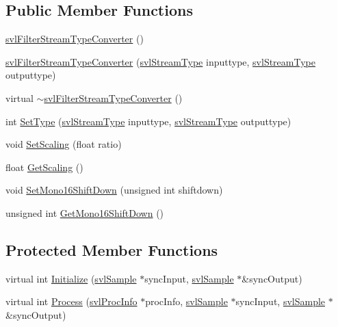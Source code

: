 \subsection*{Public Member Functions}
\begin{DoxyCompactItemize}
\item 
\hyperlink{classsvl_filter_stream_type_converter_aaa77a347109c22715ab2424785271388}{svl\+Filter\+Stream\+Type\+Converter} ()
\item 
\hyperlink{classsvl_filter_stream_type_converter_a9a169d5564d8e95cd43e11eea29d97d5}{svl\+Filter\+Stream\+Type\+Converter} (\hyperlink{svl_definitions_8h_aa00696d338a58db361335a01fd11e122}{svl\+Stream\+Type} inputtype, \hyperlink{svl_definitions_8h_aa00696d338a58db361335a01fd11e122}{svl\+Stream\+Type} outputtype)
\item 
virtual \hyperlink{classsvl_filter_stream_type_converter_aeb176e9f04ed9002d8331db010bdc797}{$\sim$svl\+Filter\+Stream\+Type\+Converter} ()
\item 
int \hyperlink{classsvl_filter_stream_type_converter_a0c8243911e530f637a47db916ee48e5d}{Set\+Type} (\hyperlink{svl_definitions_8h_aa00696d338a58db361335a01fd11e122}{svl\+Stream\+Type} inputtype, \hyperlink{svl_definitions_8h_aa00696d338a58db361335a01fd11e122}{svl\+Stream\+Type} outputtype)
\item 
void \hyperlink{classsvl_filter_stream_type_converter_a36b3dca1d8716b3ffea707b3f69239eb}{Set\+Scaling} (float ratio)
\item 
float \hyperlink{classsvl_filter_stream_type_converter_add52c851017c18ab5c00d749b4b02f28}{Get\+Scaling} ()
\item 
void \hyperlink{classsvl_filter_stream_type_converter_acd2449bb21934792b41b955377485f5a}{Set\+Mono16\+Shift\+Down} (unsigned int shiftdown)
\item 
unsigned int \hyperlink{classsvl_filter_stream_type_converter_aac347664a8cee09a723cd954c921f448}{Get\+Mono16\+Shift\+Down} ()
\end{DoxyCompactItemize}
\subsection*{Protected Member Functions}
\begin{DoxyCompactItemize}
\item 
virtual int \hyperlink{classsvl_filter_stream_type_converter_aee25fce3d2cff160cdf8d6377d6e157c}{Initialize} (\hyperlink{classsvl_sample}{svl\+Sample} $\ast$sync\+Input, \hyperlink{classsvl_sample}{svl\+Sample} $\ast$\&sync\+Output)
\item 
virtual int \hyperlink{classsvl_filter_stream_type_converter_a4c9a99dcf5598b4fb1fa1b844ec1c8ee}{Process} (\hyperlink{structsvl_proc_info}{svl\+Proc\+Info} $\ast$proc\+Info, \hyperlink{classsvl_sample}{svl\+Sample} $\ast$sync\+Input, \hyperlink{classsvl_sample}{svl\+Sample} $\ast$\&sync\+Output)
\end{DoxyCompactItemize}
